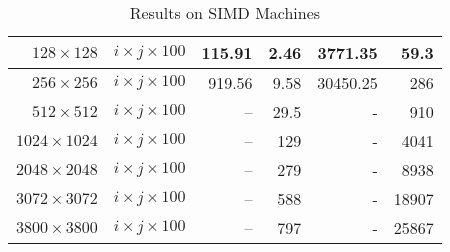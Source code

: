 \begin{table}
\begin{center}
\begin{tabular}{|r|r|r|r|r|r|}
$128  \times  128$ & $i \times j \times 100$ & 115.91  &   2.46 & 3771.35 & 59.3 \\ \hline
$256  \times  256$ & $i \times j \times 100$ & 919.56   &   9.58 & 30450.25 & 286 \\ \hline
$512  \times  512$ & $i \times j \times 100$ & -- &  29.5 & - & 910 \\ \hline
$1024 \times 1024$ & $i \times j \times 100$ & --   & 129 & - & 4041 \\ \hline
$2048 \times 2048$ & $i \times j \times 100$ & --   & 279 & - & 8938 \\ \hline
$3072 \times 3072$ & $i \times j \times 100$ & --   & 588 & - & 18907 \\ \hline
$3800 \times 3800$ & $i \times j \times 100$ & --   & 797 & - & 25867 \\ \hline \hline
\end{tabular}
\end{center}

\caption{Results on SIMD Machines}
\label{auction_simd_results}
\end{table}


